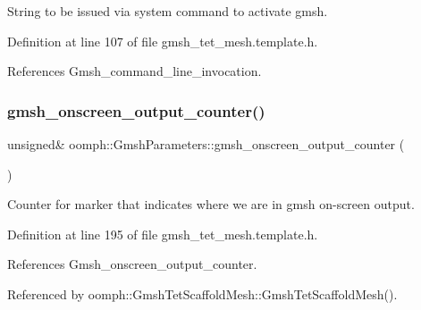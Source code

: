 String to be issued via system command to activate gmsh. 



Definition at line 107 of file gmsh\+\_\+tet\+\_\+mesh.\+template.\+h.



References Gmsh\+\_\+command\+\_\+line\+\_\+invocation.

\mbox{\label{classoomph_1_1GmshParameters_afde31eadaa2ca1862837624f68ea8d34}} 
\subsubsection{\texorpdfstring{gmsh\+\_\+onscreen\+\_\+output\+\_\+counter()}{gmsh\_onscreen\_output\_counter()}}
{\footnotesize\ttfamily unsigned\& oomph\+::\+Gmsh\+Parameters\+::gmsh\+\_\+onscreen\+\_\+output\+\_\+counter (\begin{DoxyParamCaption}{ }\end{DoxyParamCaption})\hspace{0.3cm}{\ttfamily [inline]}}



Counter for marker that indicates where we are in gmsh on-\/screen output. 



Definition at line 195 of file gmsh\+\_\+tet\+\_\+mesh.\+template.\+h.



References Gmsh\+\_\+onscreen\+\_\+output\+\_\+counter.



Referenced by oomph\+::\+Gmsh\+Tet\+Scaffold\+Mesh\+::\+Gmsh\+Tet\+Scaffold\+Mesh().

\mbox{\label{classoomph_1_1GmshParameters_ac712c282aec129e50646e6cf07a7a92e}} 
